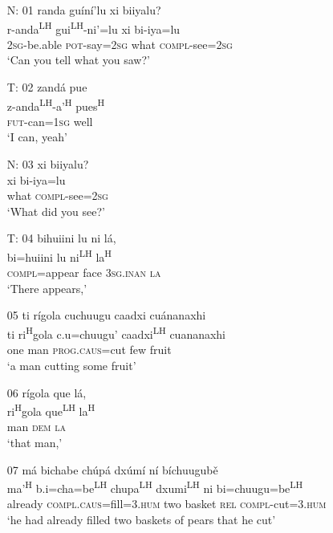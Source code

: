 

\begin{itemize}

\item[N: 01]
randa gu\'{i}n\'{i}'lu xi biiyalu?\\
r-anda\textsuperscript{LH} gui\textsuperscript{LH}-ni'=lu xi bi-iya=lu\\
\textsc{2sg}-be.able \textsc{pot}-say=\textsc{2sg} what \textsc{compl}-see=\textsc{2sg}\\
\glt `Can you tell what you saw?' 
 

\item[T: 02]
\glll zand\'{a} pue\\
z-anda\textsuperscript{LH}-a'\textsuperscript{H} pues\textsuperscript{H}\\
\textsc{fut}-can=\textsc{1sg} well\\
\glt `I can, yeah'
 

\item[N: 03]
xi biiyalu?\\
xi bi-iya=lu\\
what \textsc{compl}-see=\textsc{2sg}\\
\glt `What did you see?'


\item[T: 04]
\glll bihuiini lu ni l\'{a},\\
bi=huiini lu ni\textsuperscript{LH} la\textsuperscript{H}\\
\textsc{compl}=appear face \textsc{3sg.inan} \textsc{la}\\
\glt `There appears,'


\item[05]
\glll ti r\'{i}gola cuchuugu caadxi cu\'{a}nanaxhi\\
ti ri\textsuperscript{H}gola c.u=chuugu' caadxi\textsuperscript{LH} cuananaxhi\\
one man \textsc{prog}.\textsc{caus}=cut few fruit\\
\glt `a man cutting some fruit'


\item[06]
\glll r\'{i}gola que l\'{a},\\
ri\textsuperscript{H}gola que\textsuperscript{LH} la\textsuperscript{H}\\
man \textsc{dem} \textsc{la}\\
\glt `that man,'


\item[07]
\glll m\'{a} bichabe ch\'{u}p\'{a} dx\'{u}m\'{i} n\'{i} b\'{i}chuugub\v{e}\\
ma'\textsuperscript{H} b.i=cha=be\textsuperscript{LH}  chupa\textsuperscript{LH} dxumi\textsuperscript{LH} ni bi=chuugu=be\textsuperscript{LH}\\
already \textsc{compl}.\textsc{caus}=fill=\textsc{3.hum} two basket \textsc{rel} \textsc{compl}-cut=\textsc{3.hum}\\
\glt `he had already filled two baskets of pears that he cut'



\end{itemize}
